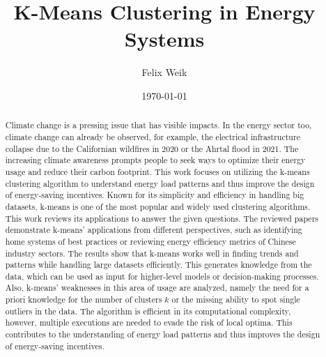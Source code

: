 \documentclass{revtex4-2}
\begin{document}
\title{K-Means Clustering in Energy Systems}
\author{Felix Weik}
\date{\today}


\begin{abstract}
Climate change is a pressing issue that has visible impacts.
In the energy sector too, climate change can already be observed, for example, the electrical infrastructure collapse due to the Californian wildfires in 2020 or the Ahrtal flood in 2021.
The increasing climate awareness prompts people to seek ways to optimize their energy usage and reduce their carbon footprint.
This work focuses on utilizing the k-means clustering algorithm to understand energy load patterns and thus improve the design of energy-saving incentives.
Known for its simplicity and efficiency in handling big datasets, k-means is one of the most popular and widely used clustering algorithms.
This work reviews its applications to answer the given questions.
The reviewed papers demonstrate k-means' applications from different perspectives, such as identifying home systems of best practices or reviewing energy efficiency metrics of Chinese industry sectors.
The results show that k-means works well in finding trends and patterns while handling large datasets efficiently.
This generates knowledge from the data, which can be used as input for higher-level models or decision-making processes.
Also, k-means' weaknesses in this area of usage are analyzed, namely the need for a priori knowledge for the number of clusters $k$ or the missing ability to spot single outliers in the data.
The algorithm is efficient in its computational complexity, however, multiple executions are needed to evade the risk of local optima.
This contributes to the understanding of energy load patterns and thus improves the design of energy-saving incentives.
\end{abstract}

\maketitle












\clearpage

\end{document}
